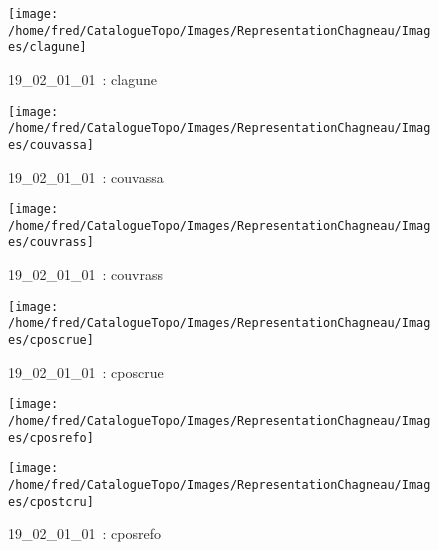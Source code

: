\documentclass[12pt,titlepage]{book}
\begin{document}
\begin{figure}[h!]
\begin{minipage}[t]{3cm}
    \begin{center}
      \texttt{[image: /home/fred/CatalogueTopo/Images/RepresentationChagneau/Images/clagune]}
      \caption[~19\_02\_01\_01]{\small{19\_02\_01\_01~:} \tiny{clagune}}\label{clagune}
    \end{center}
  \end{minipage}
  \begin{minipage}[t]{3cm}
    \begin{center}
      \texttt{[image: /home/fred/CatalogueTopo/Images/RepresentationChagneau/Images/couvassa]}
      \caption[~19\_02\_01\_01]{\small{19\_02\_01\_01~:} \tiny{couvassa}}\label{couvassa}
    \end{center}
  \end{minipage}
  \begin{minipage}[t]{3cm}
    \begin{center}
      \texttt{[image: /home/fred/CatalogueTopo/Images/RepresentationChagneau/Images/couvrass]}
      \caption[~19\_02\_01\_01]{\small{19\_02\_01\_01~:} \tiny{couvrass}}\label{couvrass}
    \end{center}
  \end{minipage}
  \begin{minipage}[t]{3cm}
    \begin{center}
      \texttt{[image: /home/fred/CatalogueTopo/Images/RepresentationChagneau/Images/cposcrue]}
      \caption[~19\_02\_01\_01]{\small{19\_02\_01\_01~:} \tiny{cposcrue}}\label{cposcrue}
    \end{center}
  \end{minipage}
  \begin{minipage}[t]{3cm}
    \begin{center}
      \texttt{[image: /home/fred/CatalogueTopo/Images/RepresentationChagneau/Images/cposrefo]}
      \caption[~19\_02\_01\_01]{\small{19\_02\_01\_01~:} \tiny{cposrefo}}\label{cposrefo}
    \end{center}
  \end{minipage}
  \begin{minipage}[t]{3cm}
    \begin{center}
      \texttt{[image: /home/fred/CatalogueTopo/Images/RepresentationChagneau/Images/cpostcru]}

\end{center}
\end{minipage}
\end{figure}
\end{document}
